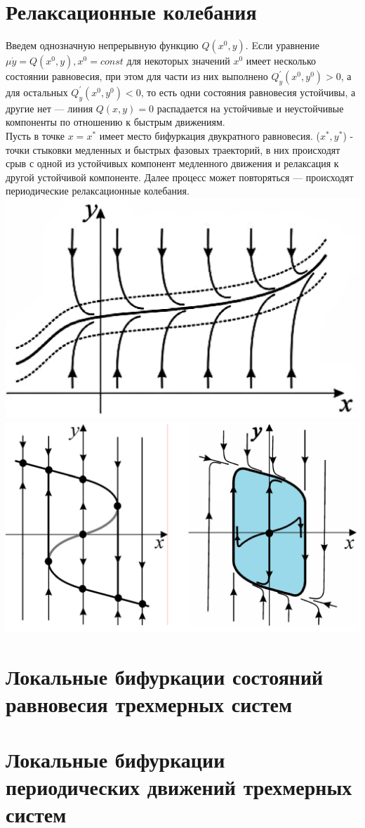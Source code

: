 \begin{multicols*}{2}
		\section{Релаксационные колебания}
		Введем однозначную непрерывную функцию $Q(x^0, y)$. Eсли уравнение $\mu \dot{y} = Q(x^0, y), x^0 = const$ для некоторых значений $x^0$ имеет несколько состоянии равновесия, при этом для части из них выполнено $Q_y^\prime(x^0, y^0) > 0$, а для остальных $Q_y^\prime(x^0, y^0) < 0$, то есть одни состояния равновесия устойчивы, а другие нет — линия $Q(x, y) = 0$ распадается на устойчивые и неустойчивые компоненты по отношению к быстрым движениям.\\
		Пусть в точке $x = x^*$ имеет место бифуркация двукратного равновесия. ($x^*, y^*$) - точки стыковки медленных и быстрых фазовых траекторий, в них происходят срыв с одной из устойчивых компонент медленного движения и релаксация к другой устойчивой компоненте. Далее процесс может повторяться — происходят периодические релаксационные колебания.\\
		\includegraphics[width=0.5\linewidth]{tk_img/sbmd_2.png}\\
		\includegraphics[width=0.5\linewidth]{tk_img/sbmd.png}\\
		
		\section{Локальные бифуркации состояний равновесия трехмерных систем}
		
		\section{Локальные бифуркации периодических движений трехмерных систем}
		
	\end{multicols*}

